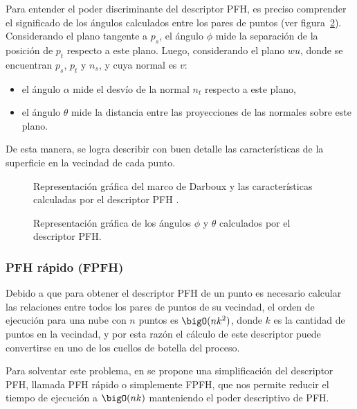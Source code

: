 Para entender el poder discriminante del descriptor PFH, es preciso comprender el significado
de los ángulos calculados entre los pares de puntos (ver figura~\ref{fig:pfh_angulos}).
Considerando el plano tangente a $p_s$, el ángulo $\phi$ mide la separación de la posición de $p_t$ respecto a este plano.
Luego, considerando el plano $wu$, donde se encuentran $p_s$, $p_t$ y $n_s$, y cuya normal es $v$:
\begin{itemize}
	\item el ángulo $\alpha$ mide el desvío de la normal $n_t$ respecto a este plano,
	\item el ángulo $\theta$ mide la distancia entre las proyecciones de las normales sobre este plano.
\end{itemize}
De esta manera, se logra describir con buen detalle las características de la superficie en la vecindad de cada punto.



\begin{figure}
	\centering
	
	\caption[Representación gráfica del marco de Darboux]{\label{fig:pfh_marco_referencia}Representación gráfica del marco de Darboux y las características calculadas por el descriptor PFH .}
\end{figure}

\begin{figure}
	\centering
	
	\caption[Representación gráfica de los ángulos $\phi$ y $\theta$ calculados por el descriptor PFH]{\label{fig:pfh_angulos}Representación gráfica de los ángulos $\phi$ y $\theta$ calculados por el descriptor PFH.}
\end{figure}

\subsubsection{PFH rápido (FPFH)}
Debido a que para obtener el descriptor PFH de un punto es necesario calcular
las relaciones entre todos los pares de puntos de su vecindad,
el orden de ejecución para una nube con $n$ puntos es $\bigO(nk^2)$,
donde $k$ es la cantidad de puntos en la vecindad,
y por esta razón el cálculo de este descriptor puede convertirse
en uno de los cuellos de botella del proceso.

Para solventar este problema, en \cite{Rusu:2009:FPF:1703435.1703733} se propone
una simplificación del descriptor PFH, llamada PFH rápido o simplemente FPFH,
que nos permite reducir el tiempo de ejecución a $\bigO(nk)$
manteniendo el poder descriptivo de PFH.

